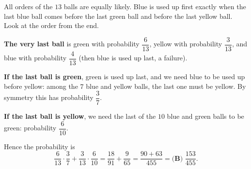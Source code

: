 All orders of the $13$ balls are equally likely. Blue is used up first exactly when the last blue ball comes before the last green ball and before the last yellow ball. Look at the order from the end.

\textbf{The very last ball} is green with probability $\dfrac{6}{13}$, yellow with probability $\dfrac{3}{13}$, and blue with probability $\dfrac{4}{13}$ (then blue is used up last, a failure).

\textbf{If the last ball is green}, green is used up last, and we need blue to be used up before yellow: among the $7$ blue and yellow balls, the last one must be yellow. By symmetry this has probability $\dfrac{3}{7}$.

\textbf{If the last ball is yellow}, we need the last of the $10$ blue and green balls to be green: probability $\dfrac{6}{10}$.

Hence the probability is
\[
\dfrac{6}{13}\cdot\dfrac{3}{7}+\dfrac{3}{13}\cdot\dfrac{6}{10}=\dfrac{18}{91}+\dfrac{9}{65}=\dfrac{90+63}{455}=\boxed{\textbf{(B) }\dfrac{153}{455}}.
\]
